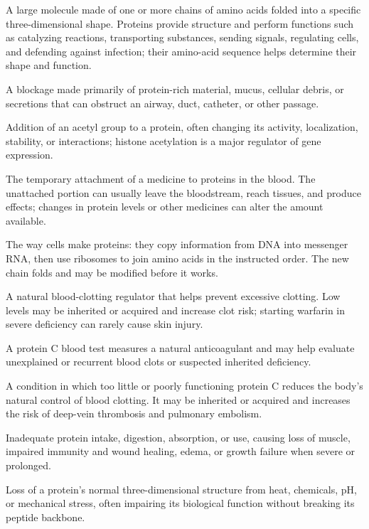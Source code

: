  A large molecule made of one or more chains of amino acids folded into a specific three-dimensional shape. Proteins provide structure and perform functions such as catalyzing reactions, transporting substances, sending signals, regulating cells, and defending against infection; their amino-acid sequence helps determine their shape and function.

 A blockage made primarily of protein-rich material, mucus, cellular debris, or secretions that can obstruct an airway, duct, catheter, or other passage.

 Addition of an acetyl group to a protein, often changing its activity, localization, stability, or interactions; histone acetylation is a major regulator of gene expression.

 The temporary attachment of a medicine to proteins in the blood. The unattached portion can usually leave the bloodstream, reach tissues, and produce effects; changes in protein levels or other medicines can alter the amount available.

 The way cells make proteins: they copy information from DNA into messenger RNA, then use ribosomes to join amino acids in the instructed order. The new chain folds and may be modified before it works.

 A natural blood-clotting regulator that helps prevent excessive clotting. Low levels may be inherited or acquired and increase clot risk; starting warfarin in severe deficiency can rarely cause skin injury.

 A protein C blood test measures a natural anticoagulant and may help evaluate unexplained or recurrent blood clots or suspected inherited deficiency.

 A condition in which too little or poorly functioning protein C reduces the body’s natural control of blood clotting. It may be inherited or acquired and increases the risk of deep-vein thrombosis and pulmonary embolism.

 Inadequate protein intake, digestion, absorption, or use, causing loss of muscle, impaired immunity and wound healing, edema, or growth failure when severe or prolonged.

 Loss of a protein’s normal three-dimensional structure from heat, chemicals, pH, or mechanical stress, often impairing its biological function without breaking its peptide backbone.

